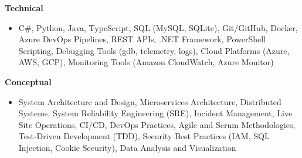 \textbf{Technical}
\begin{itemize}[leftmargin=1.5em, nosep, noitemsep]
    \item[] 
    C#,
    Python,
    Java,
    TypeScript,
    SQL (MySQL, SQLite),
    Git/GitHub,
    Docker,
    Azure DevOps Pipelines,
    REST APIs,
    .NET Framework,
    PowerShell Scripting,
    Debugging Tools (gdb, telemetry, logs),
    Cloud Platforms (Azure, AWS, GCP),
    Monitoring Tools (Amazon CloudWatch, Azure Monitor)
\end{itemize}
\textbf{Conceptual}
\begin{itemize}[leftmargin=1.5em, nosep, noitemsep]
    \item[]
    System Architecture and Design,
    Microservices Architecture,
    Distributed Systems,
    System Reliability Engineering (SRE),
    Incident Management,
    Live Site Operations,
    CI/CD,
    DevOps Practices,
    Agile and Scrum Methodologies,
    Test-Driven Development (TDD),
    Security Best Practices (IAM, SQL Injection, Cookie Security),
    Data Analysis and Visualization
\end{itemize}